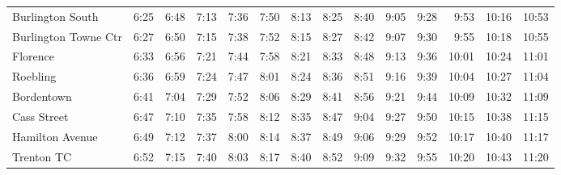 \begin{center}
\begin{tabular}{@{}lrrrrrrrrrrrrr@{}}
Burlington South & 6:25 & 6:48 & 7:13 & 7:36 & 7:50 & 8:13 & 8:25 & 8:40 & 9:05 & 9:28 & 9:53 & 10:16 & 10:53 \\
Burlington Towne Ctr & 6:27 & 6:50 & 7:15 & 7:38 & 7:52 & 8:15 & 8:27 & 8:42 & 9:07 & 9:30 & 9:55 & 10:18 & 10:55 \\
Florence & 6:33 & 6:56 & 7:21 & 7:44 & 7:58 & 8:21 & 8:33 & 8:48 & 9:13 & 9:36 & 10:01 & 10:24 & 11:01 \\
Roebling & 6:36 & 6:59 & 7:24 & 7:47 & 8:01 & 8:24 & 8:36 & 8:51 & 9:16 & 9:39 & 10:04 & 10:27 & 11:04 \\
Bordentown & 6:41 & 7:04 & 7:29 & 7:52 & 8:06 & 8:29 & 8:41 & 8:56 & 9:21 & 9:44 & 10:09 & 10:32 & 11:09 \\
Cass Street & 6:47 & 7:10 & 7:35 & 7:58 & 8:12 & 8:35 & 8:47 & 9:04 & 9:27 & 9:50 & 10:15 & 10:38 & 11:15 \\
Hamilton Avenue & 6:49 & 7:12 & 7:37 & 8:00 & 8:14 & 8:37 & 8:49 & 9:06 & 9:29 & 9:52 & 10:17 & 10:40 & 11:17 \\
Trenton TC & 6:52 & 7:15 & 7:40 & 8:03 & 8:17 & 8:40 & 8:52 & 9:09 & 9:32 & 9:55 & 10:20 & 10:43 & 11:20 \\
\bottomrule\end{tabular}\end{center}

